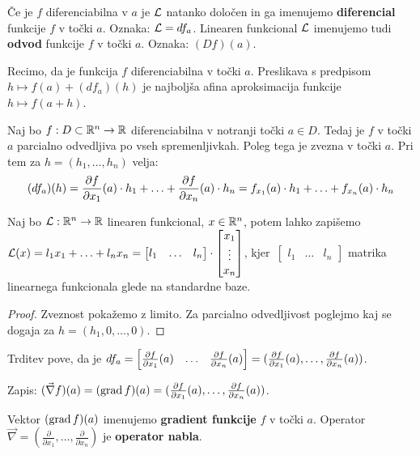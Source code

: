 \begin{definicija}
    Če je $f$ diferenciabilna v $a$ je $\mathcal{L}$ natanko določen in ga imenujemo \textbf{diferencial} funkcije $f$ v točki $a$. Oznaka: $\mathcal{L} = df_a$. Linearen funkcional $\mathcal{L}$ imenujemo tudi \textbf{odvod} funkcije $f$ v točki $a$. Oznaka: $(Df)(a)$.
\end{definicija}

\begin{opomba}
    Recimo, da je funkcija $f$ diferenciabilna v točki $a$. Preslikava s predpisom $h \mapsto f(a) + (df_a)(h)$ je najboljša afina aproksimacija funkcije $h \mapsto f(a+h)$.
\end{opomba}

\begin{trditev}
    Naj bo $f: D \subset \mathbb{R}^n \to \mathbb{R}$ diferenciabilna v notranji točki $a \in D$. Tedaj je $f$ v točki $a$ parcialno odvedljiva po vseh spremenljivkah. Poleg tega je zvezna v točki $a$. Pri tem za $h = (h_1, \ldots, h_n)$ velja:
    $$(df_a)(h) = \frac{\partial f}{\partial x_1}(a) \cdot h_1 + \ldots + \frac{\partial f}{\partial x_n}(a) \cdot h_n = f_{x_1}(a) \cdot h_1 + \ldots + f_{x_n}(a) \cdot h_n$$
\end{trditev}

\begin{opomba}
    Naj bo $\mathcal{L}: \mathbb{R}^n \to \mathbb{R}$ linearen funkcional, $x \in \mathbb{R}^n$, potem lahko zapišemo $\mathcal{L}(x) = l_1x_1+\ldots+l_nx_n = \begin{bmatrix}
        l_1 & \ldots & l_n
    \end{bmatrix} \cdot \begin{bmatrix}
        x_1 \\ \vdots \\ x_n
    \end{bmatrix}$, kjer~$\begin{bmatrix}
        l_1 & \ldots & l_n
    \end{bmatrix}$ matrika linearnega funkcionala glede na standardne baze.    
\end{opomba}

\begin{proof}
    Zveznost pokažemo z limito. Za parcialno odvedljivost poglejmo kaj se dogaja za $h = (h_1, 0, \ldots, 0)$.
\end{proof}

\begin{opomba}
    Trditev pove, da je $df_a = \begin{bmatrix}
        \frac{\partial f}{\partial x_1}(a) & \ldots & \frac{\partial f}{\partial x_n}(a) 
    \end{bmatrix} = (\frac{\partial f}{\partial x_1}(a), \ldots, \frac{\partial f}{\partial x_n}(a))$.

    Zapis: $(\vec{\nabla} f) (a) = (\operatorname{grad} f)(a) = (\frac{\partial f}{\partial x_1}(a), \ldots, \frac{\partial f}{\partial x_n}(a))$.

    Vektor $(\operatorname{grad} f)(a)$ imenujemo \textbf{gradient funkcije} $f$ v točki $a$. Operator $\vec{\nabla} = (\frac{\partial}{\partial x_1}, \ldots, \frac{\partial}{\partial x_n})$ je \textbf{operator nabla}.
\end{opomba}

